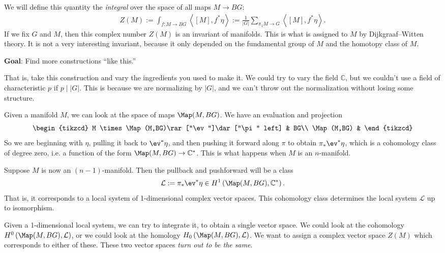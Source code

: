We will define this quantity the \textit{integral} over the space of all maps $M \to BG$:
\begin{align*}
    Z(M) := \int_{f: M \to BG} \left\langle [M], f^\ast \eta \right\rangle := \frac{1}{|G|} \sum_{\pi_1 M \to G} \left\langle [M], f^\ast\eta \right\rangle.
\end{align*}
If we fix $G$ and $M$, then this complex number $Z(M)$ is an invariant of manifolds. This is what is assigned to $M$ by Dijkgraaf--Witten theory. It is not a very interesting invariant, because it only depended on the fundamental group of $M$ and the homotopy class of $M$.


\textbf{Goal}: Find more constructions ``like this.''

That is, take this construction and vary the ingredients you used to make it. We could try to vary the field $\mathbb{C}$, but we couldn't use a field of characteristic $p$ if $p \mid |G|$. This is because we are normalizing by $|G|$, and we can't throw out the normalization without losing some structure.

Given a manifold $M$, we can look at the space of maps $\Map(M, BG)$. We have an evaluation and projection
\[ \begin{tikzcd}
    M \times \Map(M,BG)\rar["\ev"]\dar["\pi" left] & BG\\
    \Map(M,BG) &
\end{tikzcd} \]
So we are beginning with $\eta$, pulling it back to $\ev^\ast \eta$, and then pushing it forward along $\pi$ to obtain $\pi_\ast \ev^\ast \eta$, which is a cohomology class of degree zero, i.e. a function of the form $\Map(M,BG) \to \mathbb{C}^\ast$. This is what happens when $M$ is an $n$-manifold.

Suppose $M$ is now an $(n-1)$-manifold. Then the pullback and pushforward will be a class
\begin{align*}
    \mathcal{L} := \pi_\ast \ev^\ast \eta \in H^1 \left( \Map(M,BG), \mathbb{C}^\ast \right).
\end{align*}
That is, it corresponds to a local system of 1-dimensional complex vector spaces. This cohomology class determines the local system $\mathcal{L}$ up to isomorphism.

Given a 1-dimensional local system, we can try to integrate it, to obtain a single vector space. We could look at the cohomology $H^0 \left( \Map(M,BG), \mathcal{L} \right)$, or we could look at the homology $H_0 \left( \Map(M,BG), \mathcal{L} \right)$. We want to assign a complex vector space $Z(M)$ which corresponds to either of these. These two vector spaces \textit{turn out to be the same}.

